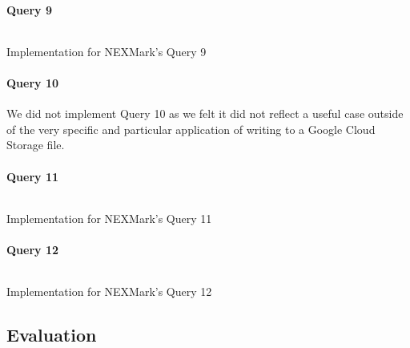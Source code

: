 \paragraph{Query 9}
\begin{listing}[H]
  \inputminted[firstline=708,lastline=744]{rust}{benchmarks/src/nexmark.rs}
  \caption{Implementation for NEXMark's Query 9}
  \label{lst:nexmark-query9}
\end{listing}

\paragraph{Query 10}
We did not implement Query 10 as we felt it did not reflect a useful case outside of the very specific and particular application of writing to a Google Cloud Storage file.

\paragraph{Query 11}
\begin{listing}[H]
  \inputminted[firstline=791,lastline=794]{rust}{benchmarks/src/nexmark.rs}
  \caption{Implementation for NEXMark's Query 11}
  \label{lst:nexmark-query11}
\end{listing}

\paragraph{Query 12}
\begin{listing}[H]
  \inputminted[firstline=818,lastline=825]{rust}{benchmarks/src/nexmark.rs}
  \caption{Implementation for NEXMark's Query 12}
  \label{lst:nexmark-query12}
\end{listing}

\subsection{Evaluation}

